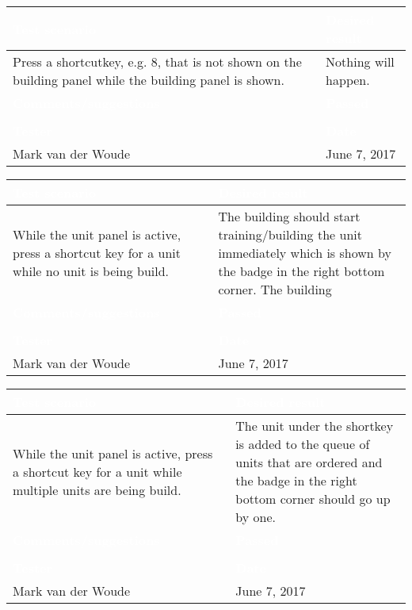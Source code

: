 \begin{tabularx}{\textwidth}{|X|X|}
\hline
\rowcolor{lightgray}\textcolor{white}{\textbf{Test scenario}} &
\textcolor{white}{\textbf{Desired result}}       
\\\hline
Press a shortcutkey, e.g. 8, that is not shown on the building panel while the building panel is shown. &
Nothing will happen. 
\\\hline
\rowcolor{lightgray}\textcolor{white}{\textbf{Comments/suggestions}} & 
\textcolor{white}{\textbf{Passed}}
\\\hline
 & \cellcolor{green}                       
\\\hline
\rowcolor{lightgray}\textcolor{white}{\textbf{Tester}} & 
\textcolor{white}{\textbf{Date}}               
\\\hline
Mark van der Woude & June 7, 2017                               		 
\\\hline
\end{tabularx}

\begin{tabularx}{\textwidth}{|X|X|}
\hline
\rowcolor{lightgray}\textcolor{white}{\textbf{Test scenario}} &
\textcolor{white}{\textbf{Desired result}}       
\\\hline
While the unit panel is active, press a shortcut key for a unit while no unit is being build. & The building should start training/building the unit immediately which is shown by the badge in the right bottom corner.
The building
\\\hline
\rowcolor{lightgray}\textcolor{white}{\textbf{Comments/suggestions}} & 
\textcolor{white}{\textbf{Passed}}
\\\hline
 & \cellcolor{green}                       
\\\hline
\rowcolor{lightgray}\textcolor{white}{\textbf{Tester}} & 
\textcolor{white}{\textbf{Date}}               
\\\hline
Mark van der Woude & June 7, 2017                               		 
\\\hline
\end{tabularx}

\begin{tabularx}{\textwidth}{|X|X|}
\hline
\rowcolor{lightgray}\textcolor{white}{\textbf{Test scenario}} &
\textcolor{white}{\textbf{Desired result}}       
\\\hline
While the unit panel is active, press a shortcut key for a unit while multiple units are being build. & The unit under the shortkey is added to the queue of units that are ordered and the  badge in the right bottom corner should go up by one.
\\\hline
\rowcolor{lightgray}\textcolor{white}{\textbf{Comments/suggestions}} & 
\textcolor{white}{\textbf{Passed}}
\\\hline
 & \cellcolor{green}                       
\\\hline
\rowcolor{lightgray}\textcolor{white}{\textbf{Tester}} & 
\textcolor{white}{\textbf{Date}}               
\\\hline
Mark van der Woude & June 7, 2017                               		 
\\\hline
\end{tabularx}

